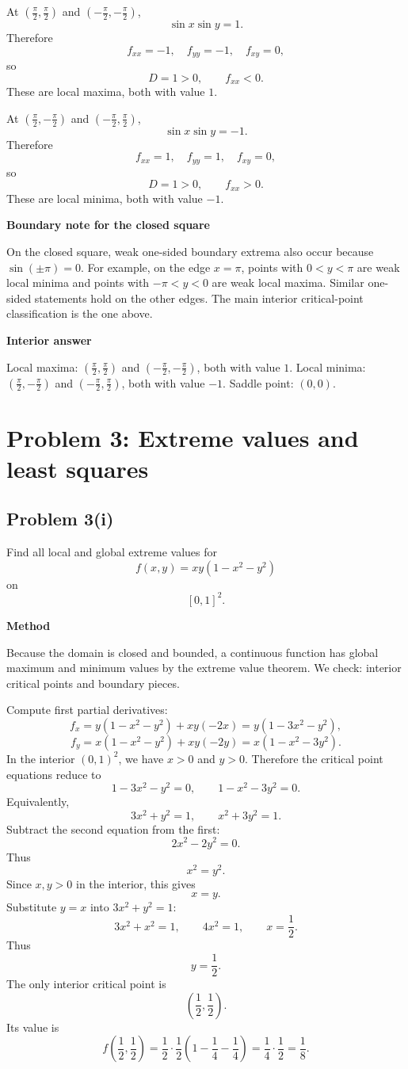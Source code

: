 \documentclass[11pt]{article}
\newenvironment{methodbox}[1]{\par\medskip\noindent\textcolor{lineblue}{\textbf{#1}}\par\smallskip}{\par\medskip}
\newenvironment{answerbox}[1]{\par\medskip\noindent\textcolor{linegreen}{\textbf{#1}}\par\smallskip}{\par\medskip}
\newenvironment{warningbox}[1]{\par\medskip\noindent\textcolor{orange!80!black}{\textbf{#1}}\par\smallskip}{\par\medskip}
\begin{document}
At $\left(\frac\pi2,\frac\pi2\right)$ and $\left(-\frac\pi2,-\frac\pi2\right)$,
\[
\sin x\sin y=1.
\]
Therefore
\[
f_{xx}=-1,
\quad f_{yy}=-1,
\quad f_{xy}=0,
\]
so
\[
D=1>0,
\qquad f_{xx}<0.
\]
These are local maxima, both with value $1$.

At $\left(\frac\pi2,-\frac\pi2\right)$ and $\left(-\frac\pi2,\frac\pi2\right)$,
\[
\sin x\sin y=-1.
\]
Therefore
\[
f_{xx}=1,
\quad f_{yy}=1,
\quad f_{xy}=0,
\]
so
\[
D=1>0,
\qquad f_{xx}>0.
\]
These are local minima, both with value $-1$.

\begin{warningbox}{Boundary note for the closed square}
On the closed square, weak one-sided boundary extrema also occur because $\sin(\pm\pi)=0$.  For example, on the edge $x=\pi$, points with $0<y<\pi$ are weak local minima and points with $-\pi<y<0$ are weak local maxima. Similar one-sided statements hold on the other edges.  The main interior critical-point classification is the one above.
\end{warningbox}

\begin{answerbox}{Interior answer}
Local maxima: $\left(\frac\pi2,\frac\pi2\right)$ and $\left(-\frac\pi2,-\frac\pi2\right)$, both with value $1$.  Local minima: $\left(\frac\pi2,-\frac\pi2\right)$ and $\left(-\frac\pi2,\frac\pi2\right)$, both with value $-1$.  Saddle point: $(0,0)$.
\end{answerbox}

\newpage
\section{Problem 3: Extreme values and least squares}

\subsection*{Problem 3(i)}
Find all local and global extreme values for
\[
f(x,y)=xy(1-x^2-y^2)
\]
on
\[
[0,1]^2.
\]

\begin{methodbox}{Method}
Because the domain is closed and bounded, a continuous function has global maximum and minimum values by the extreme value theorem. We check: interior critical points and boundary pieces.
\end{methodbox}

Compute first partial derivatives:
\[
f_x=y(1-x^2-y^2)+xy(-2x)
=y(1-3x^2-y^2),
\]
\[
f_y=x(1-x^2-y^2)+xy(-2y)
=x(1-x^2-3y^2).
\]
In the interior $(0,1)^2$, we have $x>0$ and $y>0$. Therefore the critical point equations reduce to
\[
1-3x^2-y^2=0,
\qquad
1-x^2-3y^2=0.
\]
Equivalently,
\[
3x^2+y^2=1,
\qquad x^2+3y^2=1.
\]
Subtract the second equation from the first:
\[
2x^2-2y^2=0.
\]
Thus
\[
x^2=y^2.
\]
Since $x,y>0$ in the interior, this gives
\[
x=y.
\]
Substitute $y=x$ into $3x^2+y^2=1$:
\[
3x^2+x^2=1,
\qquad 4x^2=1,
\qquad x=\frac12.
\]
Thus
\[
y=\frac12.
\]
The only interior critical point is
\[
\left(\frac12,\frac12\right).
\]
Its value is
\[
f\left(\frac12,\frac12\right)
=\frac12\cdot\frac12\left(1-\frac14-\frac14\right)
=\frac14\cdot\frac12
=\frac18.
\]
\end{document}
